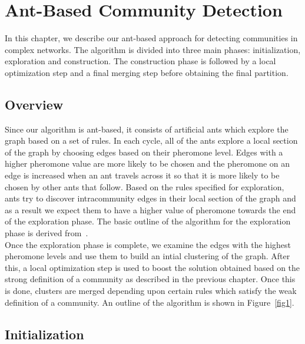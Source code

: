 \chapter{Ant-Based Community Detection}
\begin{spacing}{1.5}
In this chapter, we describe our ant-based approach for detecting communities in complex networks. The algorithm is divided into three main phases: initialization, exploration and construction. The construction phase is followed by a local optimization step and a final merging step before obtaining the final partition.

\section{Overview}

Since our algorithm is ant-based, it consists of artificial ants which explore the graph based on a set of rules. In each cycle, all of the ants explore a local section of the graph by choosing edges based on their pheromone level. Edges with a higher pheromone value are more likely to be chosen and the pheromone on an edge is increased when an ant travels across it so that it is more likely to be chosen by other ants that follow. Based on the rules specified for exploration, ants try to discover intracommunity edges in their local section of the graph and as a result we expect them to have a higher value of pheromone towards the end of the exploration phase. The basic outline of the algorithm for the exploration phase is derived from~\cite{5910378}.  \\
\indent Once the exploration phase is complete, we examine the edges with the highest pheromone levels and use them to build an intial clustering of the graph. After this, a local optimization step is used to boost the solution obtained based on the strong definition of a community as described in the previous chapter. Once this is done, clusters are merged depending upon certain rules which satisfy the weak definition of a community. An outline of the algorithm is shown in Figure~\ref{fig1}.


\section{Initialization}


\end{spacing}
